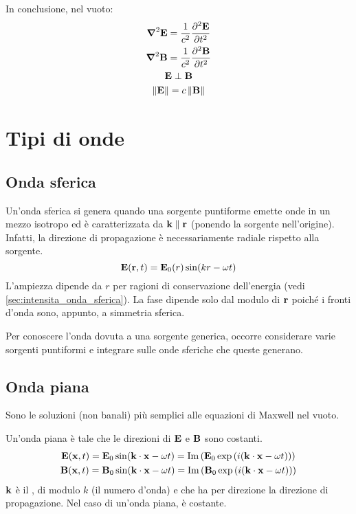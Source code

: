 In conclusione, nel vuoto:
\begin{subequations}
\begin{gather}
    \vlapl \E = \frac{1}{c^2} \parder[\E][2]{t} \\
    \vlapl \B = \frac{1}{c^2} \parder[\B][2]{t} \\
    \E \perp \B \\
    \norm{\E} = c\norm{\B}
\end{gather}
\end{subequations}


\section{Tipi di onde}

\subsection{Onda sferica}

Un'onda sferica si genera quando una sorgente puntiforme emette onde in un mezzo isotropo ed è caratterizzata da $\mathbf{k} \parallel \mathbf{r}$ (ponendo la sorgente nell'origine).
Infatti, la direzione di propagazione è necessariamente radiale rispetto alla sorgente.
\begin{equation}
    \mathbf{E}(\mathbf{r}, t) = \mathbf{E}_0(r) \sin(k r - \omega t)
\end{equation}
L'ampiezza dipende da $r$ per ragioni di conservazione dell'energia (vedi \autoref{sec:intensita_onda_sferica}).
La fase dipende solo dal modulo di $\mathbf{r}$ poiché i fronti d'onda sono, appunto, a simmetria sferica.

Per conoscere l'onda dovuta a una sorgente generica, occorre considerare varie sorgenti puntiformi e integrare sulle onde sferiche che queste generano.

\subsection{Onda piana}

Sono le soluzioni (non banali) più semplici alle equazioni di Maxwell nel vuoto.

Un'onda piana è tale che le direzioni di $\mathbf{E}$ e $\mathbf{B}$ sono costanti.
\begin{subequations}
\begin{gather}
    \mathbf{E}(\mathbf{x}, t) = \mathbf{E}_0 \sin(\mathbf{k} \cdot \mathbf{x} - \omega t)
    = \operatorname{Im}\left( \mathbf{E}_0 \operatorname{exp}\left( i(\mathbf{k} \cdot \mathbf{x} - \omega t) \right) \right) \\
    \mathbf{B}(\mathbf{x}, t) = \mathbf{B}_0 \sin(\mathbf{k} \cdot \mathbf{x} - \omega t)
    = \operatorname{Im}\left( \mathbf{B}_0 \operatorname{exp}\left( i(\mathbf{k} \cdot \mathbf{x} - \omega t) \right) \right)
\end{gather}
\end{subequations}
$\mathbf{k}$ è il , di modulo $k$ (il numero d'onda) e che ha per direzione la direzione di propagazione.
Nel caso di un'onda piana, è costante.

